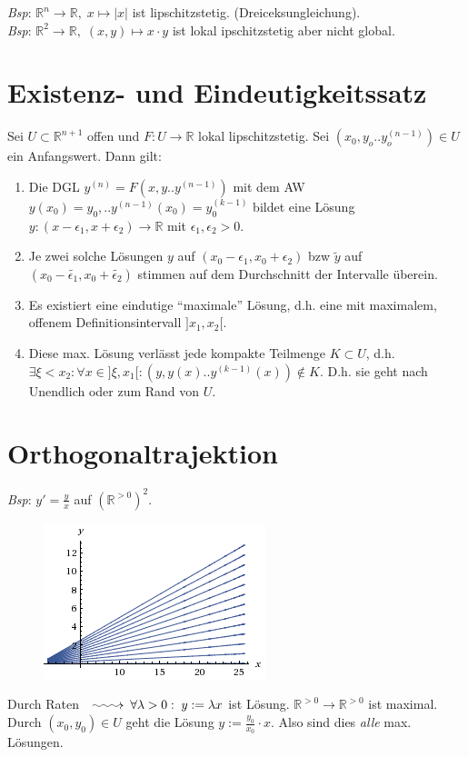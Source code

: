\documentclass[12pt,a4paper,titlepage]{article}
\makeatletter
\newcommand{\longsquiggly}{\xymatrix{{}\ar@{~>}[r]&{}}}
\makeatother
\begin{document}
\textit{Bsp}: $\mathbb{R}^n\to\mathbb{R},\;x\mapsto|x|$ ist lipschitzstetig. (Dreiceksungleichung). \\

\textit{Bsp}: $\mathbb{R}^2\to\mathbb{R},\;(x,y)\mapsto x\cdot y$ ist lokal ipschitzstetig aber nicht global.

\section*{Existenz- und Eindeutigkeitssatz}
Sei $U\subset\mathbb{R}^{n+1}$ offen und $F:U\to\mathbb{R}$ lokal lipschitzstetig. Sei $(x_0,y_o..y_o^{(n-1)})\in U$ ein Anfangswert. Dann gilt: \begin{enumerate}[label=(\alph*)]
\item Die DGL $y^{(n)}=F(x,y..y^{(n-1)})$ mit dem AW $y(x_0)=y_0,..y^{(n-1)}(x_0)=y_0^{(k-1)}$ bildet eine Lösung $y:(x-\epsilon_1,x+\epsilon_2)\to\mathbb{R}$ mit $\epsilon_1,\epsilon_2>0$.
\item Je zwei solche Lösungen $y$ auf $(x_0-\epsilon_1,x_0+\epsilon_2)$ bzw $\widetilde{y}$ auf $(x_0-\widetilde{\epsilon_1},x_0+\widetilde{\epsilon_2})$ stimmen auf dem Durchschnitt der Intervalle überein.
\item Es existiert eine eindutige ``maximale'' Lösung, d.h. eine mit maximalem, offenem Definitionsintervall $]x_1,x_2[$.
\item Diese max. Lösung verlässt jede kompakte Teilmenge $K\subset U$, d.h. $\exists\xi<x_2:\forall x\in]\xi,x_1[:(y,y(x)..y^{(k-1)}(x))\notin K$. D.h. sie geht nach Unendlich oder zum Rand von $U$.
\end{enumerate}

\section*{Orthogonaltrajektion}
\textit{Bsp}: $y'=\frac{y}{x}$ auf $(\mathbb{R}^{>0})^2$. \\
\begin{figure}[H]\centering\includegraphics{WolframAlpha--y__y_x__Sample_solution_family__2014_02_17_0239.png}\end{figure}
Durch Raten $\longsquiggly\forall\lambda>0:\; y:=\lambda x$ ist Lösung. $\mathbb{R}^{>0}\to\mathbb{R}^{>0}$ ist maximal. Durch $(x_0,y_0)\in U$ geht die Lösung $y:=\frac{y_0}{x_0}\cdot x$. Also sind dies \emph{alle} max. Lösungen. \\
\end{document}
